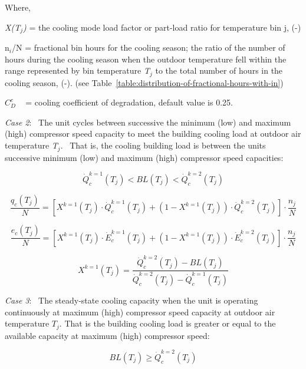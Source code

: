 Where,

\emph{X(T\(_{j}\))} = the cooling mode load factor or part-load ratio for temperature bin j, (-)

n\(_{i}\)/N = fractional bin hours for the cooling season; the ratio of the number of hours during the cooling season when the outdoor temperature fell within the range represented by bin temperature \emph{T\(_{j}\)} to the total number of hours in the cooling season, (-). (see Table~\ref{table:distribution-of-fractional-hours-with-in})

\(C_D^c\) ~ = cooling coefficient of degradation, default value is 0.25.

\emph{Case 2}:~ The unit cycles between successive the minimum (low) and maximum (high) compressor speed capacity to meet the building cooling load at outdoor air temperature \emph{T\(_{j}\)}.~ That is, the cooling building load is between the units successive minimum (low) and maximum (high) compressor speed capacities:

\begin{equation}
\dot Q_c^{k = 1}({T_j}) < BL({T_j}) < \dot Q_c^{k = 2}({T_j})
\end{equation}

\begin{equation}
  \frac{{{q_c}({T_j})}}{N} = \left[ {{X^{k = 1}}({T_j}) \cdot \dot Q_c^{k = 1}({T_j}) + \left( {1 - {X^{k = 1}}({T_j})} \right) \cdot \dot Q_c^{k = 2}({T_j})} \right] \cdot \frac{{{n_j}}}{N}
\end{equation}

\begin{equation}
  \frac{{{e_c}({T_j})}}{N} = \left[ {{X^{k = 1}}({T_j}) \cdot \dot E_c^{k = 1}({T_j}) + \left( {1 - {X^{k = 1}}({T_j})} \right) \cdot \dot E_c^{k = 2}({T_j})} \right] \cdot \frac{{{n_j}}}{N}
\end{equation}

\begin{equation}
{X^{k = 1}}({T_j}) = \frac{{\dot Q_c^{k = 2}({T_j}) - BL({T_j})}}{{\dot Q_c^{k = 2}({T_j}) - \dot Q_c^{k = 1}({T_j})}}
\end{equation}

\emph{Case 3}:~ The steady-state cooling capacity when the unit is operating continuously at maximum (high) compressor speed capacity at outdoor air temperature \(T_{j}\). That is the building cooling load is greater or equal to the available capacity at maximum (high) compressor speed:

\begin{equation}
BL({T_j}) \ge \dot Q_c^{k = 2}({T_j})
\end{equation}

